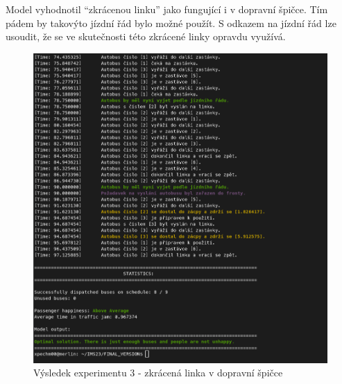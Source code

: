\documentclass[a4paper]{article}
\begin{document}
                \begin{table}[H]
                    \centering
                    \caption{Parametry experimentu 3}
                    \label{tab:experiment3}
                \end{table}

            

                Model vyhodnotil \enquote{zkrácenou linku} jako fungující i v dopravní špičce. Tím pádem by takovýto jízdní řád bylo možné použít. S odkazem na jízdní řád \cite{Jizdni_rad} lze usoudit, že se ve skutečnosti této zkrácené linky opravdu využívá. 

                \begin{figure}[H]
                \includegraphics[scale=0.48, keepaspectratio]{fig/ims_bus3.png}
                \caption{Výsledek experimentu 3 - zkrácená linka v dopravní špičce}
                \label{fig:experiment3}
            \end{figure}
            \newpage
\end{document}
